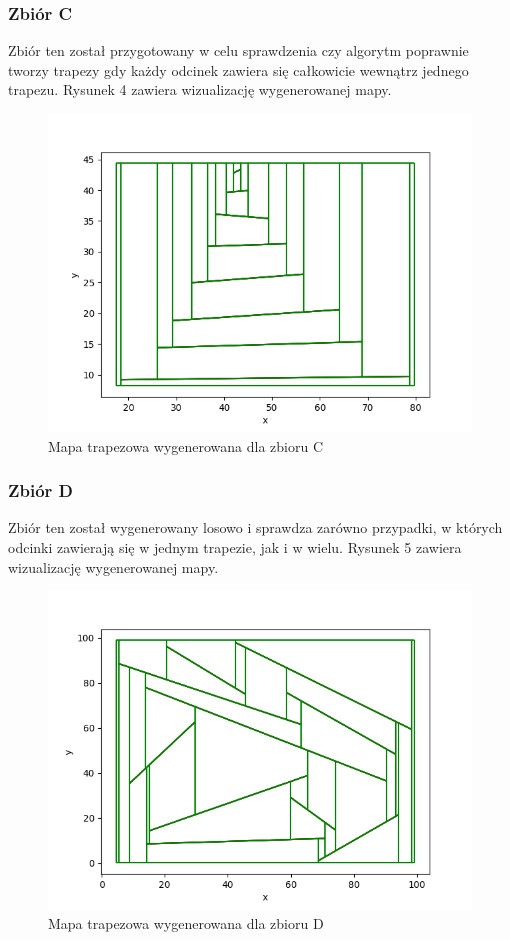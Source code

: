 \documentclass[11pt,a4paper]{article}
\begin{document}
\subsubsection{Zbiór C}
Zbiór ten został przygotowany w celu sprawdzenia
czy algorytm poprawnie tworzy trapezy gdy każdy
odcinek zawiera się całkowicie wewnątrz jednego
trapezu. Rysunek 4 zawiera wizualizację wygenerowanej mapy.

\begin{figure}[H]
    \centering
    \includegraphics[scale=0.5]{./res/figs/test_c_map.png}
    \caption{Mapa trapezowa wygenerowana dla zbioru C}
\end{figure}

\subsubsection{Zbiór D}
Zbiór ten został wygenerowany losowo i sprawdza
zarówno przypadki, w których odcinki zawierają się
w jednym trapezie, jak i w wielu. Rysunek 5
zawiera wizualizację wygenerowanej mapy.

\begin{figure}[H]
    \centering
    \includegraphics[scale=0.5]{./res/figs/test_d_map.png}
    \caption{Mapa trapezowa wygenerowana dla zbioru D}
\end{figure}
\end{document}
